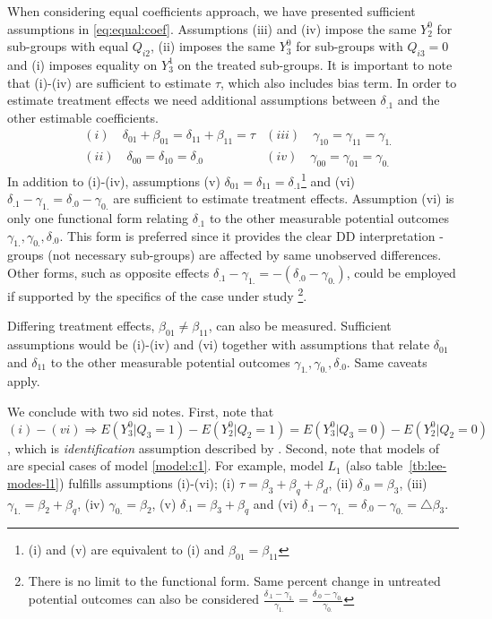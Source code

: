 \documentclass[12pt]{article}
\begin{document}
When considering equal coefficients approach, we have presented sufficient assumptions in  \ref{eq:equal:coef}. Assumptions (iii) and (iv) impose the same $Y_2^0$ for sub-groups with equal $Q_{i2}$, (ii) imposes the same $Y_3^0$ for sub-groups with $Q_{i3}=0$ and (i) imposes equality on $Y_3^1$ on the treated sub-groups. It is important to note that (i)-(iv) are sufficient to estimate $\tau$, which also includes bias term. In order to estimate treatment effects we need additional assumptions between $\delta_{.1}$ and the other estimable coefficients.
\begin{align*}\label{eq:equal:coef}
&(i) \quad \delta_{01}+\beta_{01} = \delta_{11}+\beta_{11} = \tau & (iii) \quad \gamma_{10}= \gamma_{11}=\gamma_{1.} \\
&(ii) \quad \delta_{00}= \delta_{10}=\delta_{.0} & (iv) \quad \gamma_{00}= \gamma_{01}=\gamma_{0.} \tag{EQ}
\end{align*}
 In addition to (i)-(iv), assumptions (v) $\delta_{01}=\delta_{11}=\delta_{.1}$\footnote{(i) and (v) are equivalent to (i) and $\beta_{01}=\beta_{11}$} and (vi) $\delta_{.1}-\gamma_{1.} = \delta_{.0}-\gamma_{0.}$ are sufficient to estimate treatment effects. Assumption (vi) is only one functional form relating $\delta_{.1}$ to the other measurable potential outcomes $\gamma_{1.},\gamma_{0.}, \delta_{.0}$. This form is preferred since it provides the clear DD interpretation - groups (not necessary sub-groups) are affected by same unobserved differences. Other forms, such as opposite effects $\delta_{.1}-\gamma_{1.} = -(\delta_{.0}-\gamma_{0.})$, could be employed if supported by the specifics of the case under study \footnote{There is no limit to the functional form. Same percent change in untreated potential outcomes can also be considered $\frac{\delta_{.1}-\gamma_{1.}}{\gamma_{1.}}=\frac{\delta_{.0}-\gamma_{0.}}{\gamma_{0.}}$}. 
 
 Differing treatment effects, $\beta_{01} \neq \beta_{11}$, can also be measured. Sufficient assumptions would be (i)-(iv) and (vi) together with assumptions that relate $\delta_{01}$ and $\delta_{11}$ to the other measurable potential outcomes $\gamma_{1.},\gamma_{0.}, \delta_{.0}$. Same caveats apply.

We conclude with two sid notes. First, note that $(i)-(vi) \Rightarrow E(Y_3^0| Q_3=1) - E(Y_2^0| Q_2=1) = E(Y_3^0| Q_3=0) - E(Y_2^0| Q_2=0)$, which is \textit{identification} assumption described by \cite{lee2006identification}. Second, note that models of \cite{lee2014difference} are special cases of model \ref{model:c1}. For example,  model $L_1$ (also table~\ref{tb:lee-modes-l1}) fulfills assumptions (i)-(vi); (i) $\tau = \beta_{3} + \beta_{q} + \beta_{d} $, (ii) $\delta_{.0} = \beta_{3}$, (iii) $\gamma_{1.} = \beta_{2} + \beta_{q} $, (iv) $\gamma_{0.} = \beta_{2} $, (v) $\delta_{.1} = \beta_{3} + \beta_{q} $ and (vi) $\delta_{.1}-\gamma_{1.} = \delta_{.0}-\gamma_{0.} = \triangle \beta_{3} $.
\end{document}
